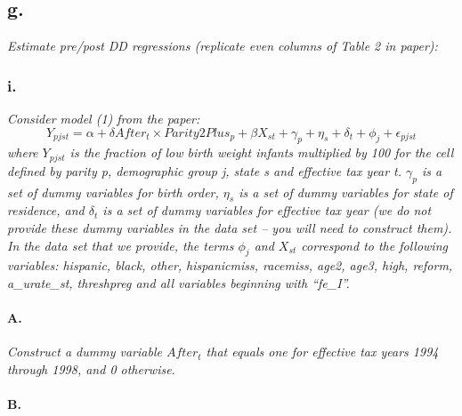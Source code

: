 \documentclass[
]{article}
\newenvironment{Shaded}{\begin{snugshade}}{\end{snugshade}}
\newcommand{\DecValTok}[1]{\textcolor[rgb]{0.00,0.00,0.81}{#1}}
\newcommand{\KeywordTok}[1]{\textcolor[rgb]{0.13,0.29,0.53}{\textbf{#1}}}
\newcommand{\NormalTok}[1]{#1}
\newcommand{\OperatorTok}[1]{\textcolor[rgb]{0.81,0.36,0.00}{\textbf{#1}}}
\newcommand{\StringTok}[1]{\textcolor[rgb]{0.31,0.60,0.02}{#1}}
\begin{document}
\hypertarget{g.}{%
\subsection{g.}\label{g.}}

\emph{Estimate pre/post DD regressions (replicate even columns of Table
2 in paper):}

\hypertarget{i.}{%
\subsubsection{i.}\label{i.}}

\emph{Consider model (1) from the paper:}
\[Y_{pjst} = \alpha + \delta After_{t} \times Parity2Plus_{p} + \beta X_{st} + \gamma_p + \eta_s + \delta_t + \phi_j + \epsilon_{pjst}\]
\emph{where \(Y_{pjst}\) is the fraction of low birth weight infants
multiplied by 100 for the cell defined by parity p, demographic group j,
state s and effective tax year t. \(\gamma_p\) is a set of dummy
variables for birth order, \(\eta_s\) is a set of dummy variables for
state of residence, and \(\delta_t\) is a set of dummy variables for
effective tax year (we do not provide these dummy variables in the data
set -- you will need to construct them). In the data set that we
provide, the terms \(\phi_j\) and \(X_{st}\) correspond to the following
variables: hispanic, black, other, hispanicmiss, racemiss, age2, age3,
high, reform, a\_urate\_st, threshpreg and all variables beginning with
``fe\_I''.}

\hypertarget{a.-4}{%
\paragraph{A.}\label{a.-4}}

\emph{Construct a dummy variable \(After_t\) that equals one for
effective tax years 1994 through 1998, and 0 otherwise.}

\begin{Shaded}
\end{Shaded}

\hypertarget{b.-4}{%
\paragraph{B.}\label{b.-4}}
\end{document}
